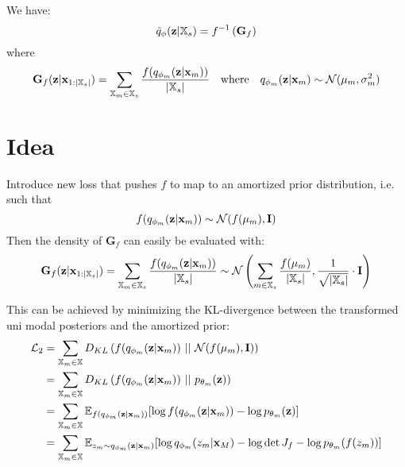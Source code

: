 \documentclass[11pt,english]{article}
\begin{document}
    We have:
    \begin{equation}
        \tilde{q}_{\phi}(\textbf{z}|\mathbb{X}_s) = f^{-1}\left( \textbf{G}_f \right)
    \end{equation}
    where
    \begin{equation}
        \textbf{G}_f(\textbf{z}|\textbf{x}_{1:|\mathbb{X}_s|}) =\sum _{\mathbb{X}_m \in \mathbb{X}_s} \frac{f(q_{\phi_m}(\textbf{z}|\textbf{x}_m))}{|\mathbb{X}_s|} \quad \text{where} \quad q_{\phi_m}(\textbf{z}|\textbf{x}_m) \sim \mathcal{N}(\mu_m, \sigma_m^2)
    \end{equation}

    \section*{Idea}

    Introduce new loss that pushes $f$ to map to an amortized prior distribution, i.e. such that
    \begin{equation}
        f(q_{\phi_m}(\textbf{z}|\textbf{x}_m)) \sim \mathcal{N}(f(\mu_m), \textbf{I})
    \end{equation}
    Then the density of $\textbf{G}_f$ can easily be evaluated with:
    \begin{equation}
        \textbf{G}_f(\textbf{z}|\textbf{x}_{1:|\mathbb{X}_s|}) =\sum _{\mathbb{X}_m \in \mathbb{X}_s} \frac{f(q_{\phi_m}(\textbf{z}|\textbf{x}_m))}{|\mathbb{X}_s|} \sim \mathcal{N} \left(  \sum _{m \in \mathbb{X}_s} \frac{f(\mu_m)}{|\mathbb{X}_s|}, \frac{1}{\sqrt{|\mathbb{X}_s|}}  \cdot \textbf{I} \right)
    \end{equation}


    This can be achieved by minimizing the KL-divergence between the transformed uni modal posteriors and the amortized prior:
    \begin{equation}
        \begin{split}
            \mathcal{L}_2 &= \sum _{\mathbb{X}_m \in \mathbb{X}} D_{KL}\left( f(q_{\phi_m}(\textbf{z}|\textbf{x}_m))\ ||\ \mathcal{N}(f(\mu_m), \textbf{I}) \right)\\
            &= \sum _{\mathbb{X}_m \in \mathbb{X}} D_{KL}\left( f(q_{\phi_m}(\textbf{z}|\textbf{x}_m))\ ||\ p_{\theta_m}(\textbf{z}) \right)\\
            &=  \sum _{\mathbb{X}_m \in \mathbb{X}} \mathbb{E}_{f(q_{\phi_m}(\textbf{z}|\textbf{x}_m))} [\log f(q_{\phi_m}(\textbf{z}|\textbf{x}_m)) - \log p_{\theta_m}(\textbf{z})]\\
            &=  \sum _{\mathbb{X}_m \in \mathbb{X}} \mathbb{E}_{z_m \sim q_{\phi_m}(\textbf{z}|\textbf{x}_m)} [\log q_{\phi_m}(z_m|\textbf{x}_M) - \log \det J_f  - \log p_{\theta_m}(f(z_m))]\\
        \end{split}
    \end{equation}
\end{document}
